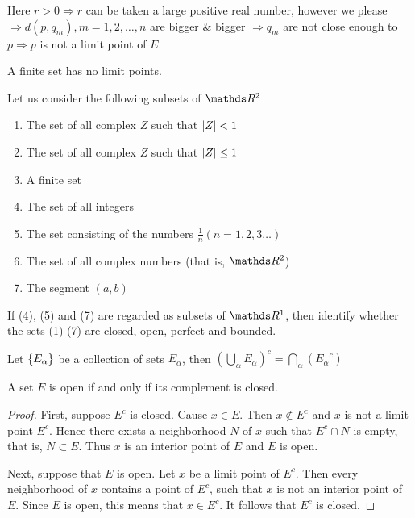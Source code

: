 \documentclass[../main-sheet.tex]{subfiles}
\begin{document}
\begin{note}
    Here $ r>0\Rightarrow r $ can be taken a large positive real number, however we please $ \Rightarrow d(p,q_m), m=1,2,\dots,n $ are bigger \& bigger $ \Rightarrow q_m $ are not close enough to $ p \Rightarrow p $ is not a limit point of $ E $. 
\end{note}
\begin{cor}
    A finite set has no limit points.
\end{cor}
\begin{prob}
    Let us consider the following subsets of $ \R^2 $
    \begin{enumerate}
        \item The set of all complex $ Z $ such that $ \left\vert Z\right\vert<1 $
        \item The set of all complex $ Z $ such that $ \left\vert Z\right\vert\leq1 $
        \item A finite set
        \item The set of all integers
        \item The set consisting of the numbers $ \frac{1}{n}(n=1,2,3\dots) $
        \item The set of all complex numbers (that is, $ \R^2 $)
        \item The segment $ (a,b) $
    \end{enumerate}
    If (4), (5) and (7) are regarded as subsets of $ \R^1 $, then identify whether the sets (1)-(7) are closed, open, perfect and bounded.
\end{prob}
\begin{thm}
    Let $ \left\{E_\alpha\right\} $ be a collection of sets $ E_\alpha $, then $ (\bigcup_\alpha E_\alpha)^c  = \bigcap_\alpha ({E_\alpha}^c)$
\end{thm}
\begin{thm}
    A set $ E $ is open if and only if its complement is closed.
\end{thm}
\begin{proof}
    First, suppose $ E^c $ is closed. Cause $ x\in E $. Then $ x\notin E^c $ and $ x $ is not a limit point $ E^c $. Hence there exists a neighborhood $ N $ of $ x $ such that $ E^c \cap N $ is empty, that is, $ N\subset E $. Thus $ x $ is an interior point of $ E $ and $ E $ is open.
    
    Next, suppose that $ E $ is open. Let $ x $ be a limit point of $ E^c $. Then every neighborhood of $ x $ contains a point of $ E^c $, such that $ x $ is not an interior point of $ E $. Since $ E $ is open, this means that $ x\in E^c $. It follows that $ E^c $ is closed.
\end{proof}
\end{document}
